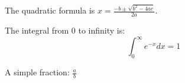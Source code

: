 The quadratic formula is $x = \frac{-b \pm \sqrt{b^2 - 4ac}}{2a}$.

The integral from 0 to infinity is: $$\int_0^\infty e^{-x} dx = 1$$

A simple fraction: $\frac{a}{b}$